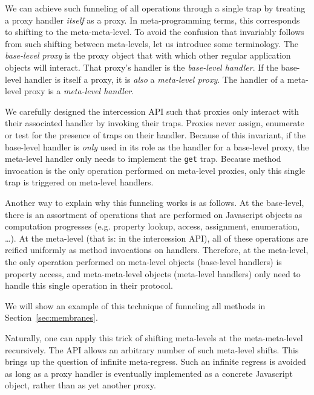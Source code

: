 \documentclass{acm_proc_article-sp}
\begin{document}
We can achieve such funneling of all operations through a single trap by treating a proxy handler \emph{itself} as a proxy. In meta-programming terms, this corresponds to shifting to the meta-meta-level. To avoid the confusion that invariably follows from such shifting between meta-levels, let us introduce some terminology. The \emph{base-level proxy} is the proxy object that with which other regular application objects will interact. That proxy's handler is the \emph{base-level handler}. If the base-level handler is itself a proxy, it is \emph{also} a \emph{meta-level proxy}. The handler of a meta-level proxy is a \emph{meta-level handler}.

We carefully designed the intercession API such that proxies only interact with their associated handler by invoking their traps. Proxies never assign, enumerate or test for the presence of traps on their handler. Because of this invariant, if the base-level handler is \emph{only} used in its role as the handler for a base-level proxy, the meta-level handler only needs to implement the \texttt{get} trap. Because method invocation is the only operation performed on meta-level proxies, only this single trap is triggered on meta-level handlers.


Another way to explain why this funneling works is as follows. At the base-level, there is an assortment of operations that are performed on Javascript objects as computation progresses (e.g. property lookup, access, assignment, enumeration, \ldots). At the meta-level (that is: in the intercession API), all of these operations are reified uniformly as method invocations on handlers. Therefore, at the meta-level, the only operation performed on meta-level objects (base-level handlers) is property access, and meta-meta-level objects (meta-level handlers) only need to handle this single operation in their protocol.

We will show an example of this technique of funneling all methods in Section~\ref{sec:membranes}.

Naturally, one can apply this trick of shifting meta-levels at the meta-meta-level recursively. The API allows an arbitrary number of such meta-level shifts. This brings up the question of infinite meta-regress. Such an infinite regress is avoided as long as a proxy handler is eventually implemented as a concrete Javascript object, rather than as yet another proxy.
\end{document}
